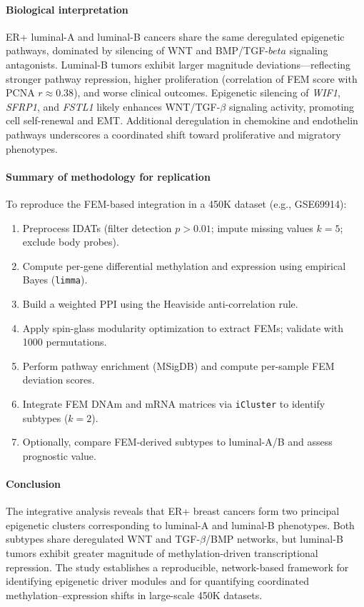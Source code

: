 \documentclass[10pt]{extarticle}
\begin{document}
\paragraph{Biological interpretation}
ER+ luminal-A and luminal-B cancers share the same deregulated epigenetic pathways, dominated by silencing of WNT and BMP/TGF-$beta$ signaling antagonists. Luminal-B tumors exhibit larger magnitude deviations—reflecting stronger pathway repression, higher proliferation (correlation of FEM score with PCNA \(r \approx 0.38\)), and worse clinical outcomes.  
Epigenetic silencing of \textit{WIF1}, \textit{SFRP1}, and \textit{FSTL1} likely enhances WNT/TGF-$\beta$ signaling activity, promoting cell self-renewal and EMT. Additional deregulation in chemokine and endothelin pathways underscores a coordinated shift toward proliferative and migratory phenotypes.

\paragraph{Summary of methodology for replication}
To reproduce the FEM-based integration in a 450K dataset (e.g., GSE69914):
\begin{enumerate}
\item Preprocess IDATs (filter detection $p>0.01$; impute missing values $k=5$; exclude body probes).
\item Compute per-gene differential methylation and expression using empirical Bayes (\texttt{limma}).
\item Build a weighted PPI using the Heaviside anti-correlation rule.
\item Apply spin-glass modularity optimization to extract FEMs; validate with 1000 permutations.
\item Perform pathway enrichment (MSigDB) and compute per-sample FEM deviation scores.
\item Integrate FEM DNAm and mRNA matrices via \texttt{iCluster} to identify subtypes ($k=2$).
\item Optionally, compare FEM-derived subtypes to luminal-A/B and assess prognostic value.
\end{enumerate}

\paragraph{Conclusion}
The integrative analysis reveals that ER+ breast cancers form two principal epigenetic clusters corresponding to luminal-A and luminal-B phenotypes. Both subtypes share deregulated WNT and TGF-$\beta$/BMP networks, but luminal-B tumors exhibit greater magnitude of methylation-driven transcriptional repression. The study establishes a reproducible, network-based framework for identifying epigenetic driver modules and for quantifying coordinated methylation–expression shifts in large-scale 450K datasets.
\end{document}
